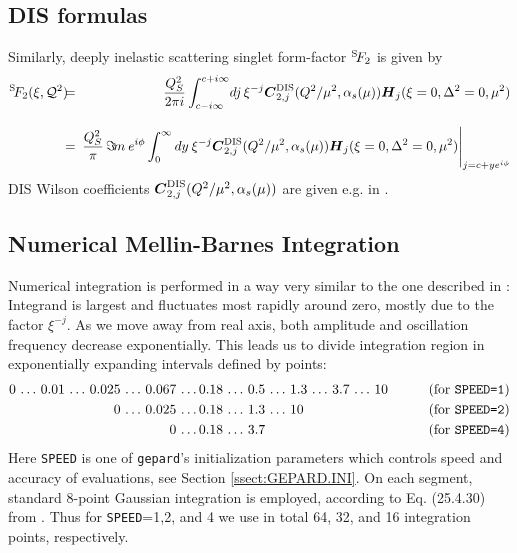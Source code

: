\documentclass[12pt]{article}
\begin{document}
\subsection{DIS formulas}  

Similarly, deeply inelastic scattering singlet form-factor ${^{\rm S}\!{F_2}}$ is given by
\begin{eqnarray}
{^{\rm S}\!{F_2}}(\xi,{\cal Q}^2)
&\!\!\!=\!\!\!& \frac{Q_{S}^2}{2 \pi i}\int_{c-i \infty}^{c+ i \infty}\!
dj\,\xi^{-j}
\mbox{\boldmath $C$}^{\rm DIS}_{2,j}(Q^2/\mu^2,\alpha_s(\mu))
\mbox{\boldmath $H$}_{j} (\xi=0,\Delta^2=0,\mu^2) \nonumber \\[2ex]
&\!\!\!=\!\!\!& \frac{Q_{S}^2}{\pi}\, \Im\! m\: e^{i\phi}
\int_{0}^{\infty} dy\:  \xi^{-j}
\mbox{\boldmath $C$}^{\rm DIS}_{2,j}(Q^2/\mu^2,\alpha_s(\mu))
\mbox{\boldmath $H$}_{j} (\xi=0,\Delta^2=0,\mu^2) 
\Bigg|_{j = c + y e^{i\phi}}
\label{<F2formula>}
\end{eqnarray}
DIS Wilson coefficients $\mbox{\boldmath $C$}^{\rm DIS}_{2,j}(Q^2/\mu^2,\alpha_s(\mu))$
are given e.g. in \cite{vanNeerven:2000uj}.

\subsection{Numerical Mellin-Barnes Integration}  
\label{ssect:Integration}
Numerical integration is performed in a way very similar to the one described in
\cite{Vogt:2004ns}: Integrand is largest and
fluctuates most rapidly around zero, mostly due to the factor $\xi^{-j}$. As we
move away from real axis, both
amplitude and oscillation frequency decrease exponentially.
This leads us to divide integration region in exponentially expanding intervals
defined by points:
\begin{align*}
0 \,\ldots\, 0.01 \,\ldots\, 0.025\,\ldots\, 0.067\,\ldots\,& 0.18\,\ldots\, 0.5\,\ldots\, 1.3\,\ldots\, 3.7\,\ldots\, 10&
\qquad \text{(for \texttt{SPEED=1})} \\
0  \,\ldots\, 0.025\,\ldots\,& 0.18\,\ldots\, 1.3 \,\ldots\, 10&
\qquad \text{(for \texttt{SPEED=2})} \\
0  \,\ldots\,& 0.18 \,\ldots\, 3.7&
\qquad \text{(for \texttt{SPEED=4})} \\
\label{<intervals>}
\end{align*}
Here \texttt{SPEED} is one of \texttt{gepard}'s initialization parameters which
controls speed and accuracy of evaluations, see Section \ref{ssect:GEPARD.INI}.
On each segment, standard 8-point Gaussian integration is employed, according
to Eq. (25.4.30) from \cite{AbS65}.
Thus for \texttt{SPEED}=1,2, and 4 we use in total 64, 32, and 16
integration points, respectively. 
\end{document}

